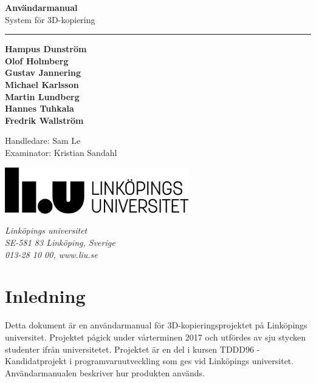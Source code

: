 \documentclass[a4paper,titlepage,12pt]{article}
\begin{document}
\begin{titlepage}

\vspace*{\fill}
\huge
\textbf{Användarmanual} \\
\Large
System för 3D-kopiering \\
\noindent\rule{17cm}{0.4pt}
\bigskip

\small
\textbf{Hampus Dunström \\
Olof Holmberg \\
Gustav Jannering \\
Michael Karlsson \\
Martin Lundberg \\
Hannes Tuhkala \\
Fredrik Wallström}
\bigskip
\bigskip

Handledare: Sam Le \\
Examinator: Kristian Sandahl

\date{\today}
\vspace*{\fill}

\vspace*{\fill}
\begin{minipage}[b]{0.7\textwidth}
	\includegraphics[width=8cm]{images/liu-logga.png}
\end{minipage}
\begin{minipage}[b]{0.4\textwidth}
	\normalsize
	\textit{Linköpings universitet} \\
	\textit{SE-581 83 Linköping, Sverige}\\
	\textit{013-28 10 00, www.liu.se}
\end{minipage}

\end{titlepage}
\newpage
\begin{center}

\tableofcontents
\newpage

\end{center}

\section{Inledning}
	Detta dokument är en användarmanual för 3D-kopieringsprojektet på Linköpings universitet. Projektet pågick under vårterminen 2017 och utfördes av sju stycken studenter ifrån universitetet. Projektet är en del i kursen TDDD96 - Kandidatprojekt i programvaruutveckling som ges vid Linköpings universitet. Användarmanualen beskriver hur produkten används.
\end{document}

